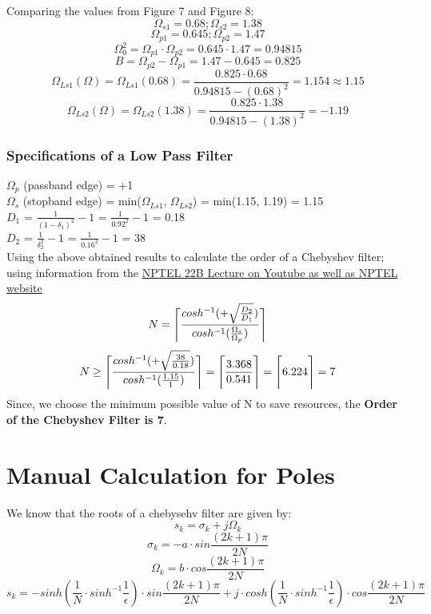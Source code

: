 \documentclass{article}
\DeclarePairedDelimiter{\ceil}{\lceil}{\rceil}
\begin{document}
Comparing the values from Figure 7 and Figure 8:
\[
    \Omega_{s1} = 0.68; \Omega_{s2} = 1.38
\]
\[
    \Omega_{p1} = 0.645; \Omega_{p2} = 1.47
\]
\[
    \Omega_0^2 = \Omega_{p1} \cdot \Omega_{p2} = 0.645 \cdot 1.47 = 0.94815
\]
\[
    B = \Omega_{p2} - \Omega_{p1} = 1.47 - 0.645 = 0.825
\]
\[
    \Omega_{Ls1}(\Omega) = \Omega_{Ls1}(0.68) = \frac{0.825\cdot 0.68}{0.94815 - (0.68)^2} = 1.154 \approx 1.15
\]
\[
    \Omega_{Ls2}(\Omega) = \Omega_{Ls2}(1.38) = \frac{0.825\cdot 1.38}{0.94815 - (1.38)^2} = -1.19
\]


\subsubsection{Specifications of a Low Pass Filter}
$\Omega_p$ (passband edge) = +1\\
$\Omega_s$ (stopband edge) = min($\Omega_{Ls1}$, $\Omega_{Ls2}$) = min(1.15, 1.19) = 1.15\\
$D_1$ = $\frac{1}{(1-\delta_1)^2} - 1$ = $\frac{1}{0.92^2} - 1$ = 0.18\\
$D_2$ = $\frac{1}{\delta_2^2} - 1$ = $\frac{1}{0.16^2} - 1$ = 38\\
Using the above obtained results to calculate the order of a Chebyshev filter; using information from the \href{https://youtu.be/lM7oEy2s8Fw}{NPTEL 22B Lecture on Youtube as well as NPTEL website}\\
\[
    N = \ceil[\Bigg]{\frac{cosh^{-1}(+\sqrt{\frac{D_2}{D_1}})}{cosh^{-1}(\frac{\Omega_s}{\Omega_p})}}
\]
\[
    N \geq \ceil[\Bigg]{\frac{cosh^{-1}(+\sqrt{\frac{38}{0.18}})}{cosh^{-1}(\frac{1.15}{1})}} = \ceil[\Bigg]{\frac{3.368}{0.541}} = \ceil[\Bigg]{6.224} = 7
\]
Since, we choose the minimum possible value of N to save resources, the \textbf{Order of the Chebyshev Filter is 7}.


\section{Manual Calculation for Poles}
We know that the roots of a chebysehv filter are given by:
\[
    s_k = \sigma_k + j\Omega_k
\]
\[
    \sigma_k = - a\cdot sin\frac{(2k + 1) \pi}{2N}
\]
\[
    \Omega_k = b\cdot cos\frac{(2k + 1) \pi}{2N}
\]
\[
    s_k = - sinh(\frac{1}{N}\cdot sinh^{-1}\frac{1}{\epsilon}) \cdot sin\frac{(2k + 1) \pi}{2N} + j \cdot cosh(\frac{1}{N}\cdot sinh^{-1}\frac{1}{\epsilon}) \cdot cos\frac{(2k + 1) \pi}{2N}
\]
\end{document}
